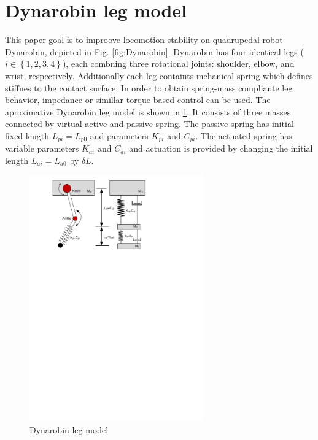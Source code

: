 
\section{Dynarobin leg model}

This paper goal is to improove locomotion stability on quadrupedal robot Dynarobin, depicted in Fig. \ref{fig:Dynarobin}. Dynarobin has four identical legs ($i\in \left \{ 1,2,3,4 \right \}$), each combning three rotational joints: shoulder, elbow, and wrist, respectively. Additionally each leg containts mehanical spring which defines stiffnes to the contact surface. In order to obtain spring-mass compliante leg behavior, impedance or simillar torque based control can be used. The aproximative Dynarobin leg model is shown in \ref{fig:DynarobinLEG}. It consists of three masses connected by virtual active and passive spring. The passive spring has initial fixed length $L_{pi}=L_{p0}$ and parameters $K_{pi}$ and $C_{pi}$.  The actuated spring has variable parameters $K_{ai}$ and $C_{ai}$ and actuation is provided by changing the initial length $L_{ai}=L_{a0}$ by $\delta L$.
\begin{figure}
	\centering
	\includegraphics[width=75mm]{./pictures/Dynarobin_leg.pdf}
	\caption{Dynarobin leg model}
	\label{fig:DynarobinLEG}
\end{figure}
